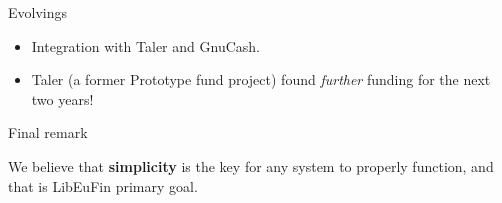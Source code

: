 \documentclass[pdf]{beamer}
\begin{document}
\begin{frame}{Evolvings}
  \begin{itemize}
    \item Integration with Taler and GnuCash.
    \item Taler (a former Prototype fund project) found {\it further} funding for the next two years!
  \end{itemize}
\end{frame}

\begin{frame}{Final remark}
  \begin{center}
  We believe that \textbf{simplicity} is the key for any system to
  properly function, and that is LibEuFin primary goal.
  \end{center}
\end{frame}
\end{document}
